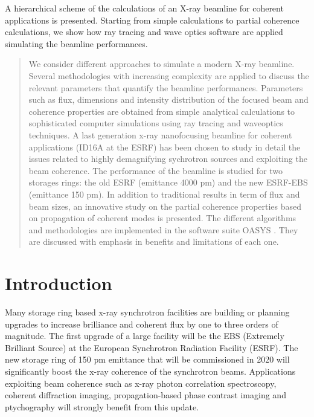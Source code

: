 \documentclass{iucr}              %
\begin{document}


\maketitle                        %

\begin{synopsis}
A hierarchical scheme of the calculations of an X-ray beamline for coherent applications is presented. Starting from simple calculations to partial coherence calculations, we show how ray tracing and wave optics software are applied simulating the beamline performances.   
\end{synopsis}

\begin{abstract}
We consider different approaches to simulate a modern X-ray beamline. Several methodologies with increasing complexity are applied to discuss the relevant parameters that quantify the beamline performances. Parameters such as flux, dimensions and intensity distribution of the focused beam and coherence properties are obtained from simple analytical calculations to sophisticated computer simulations using ray tracing and waveoptics techniques. A last generation x-ray nanofocusing beamline for coherent  applications (ID16A at the ESRF) has been chosen  to study in detail the issues related to highly demagnifying sychrotron sources and exploiting the beam coherence. The performance of the beamline is studied for two storages rings: the old ESRF (emittance 4000 pm) and the new ESRF-EBS (emittance 150 pm). In addition to traditional results in term of flux and beam sizes, an innovative study on the partial coherence properties based on propagation of coherent modes is presented. The different algorithms and methodologies are implemented in the software suite OASYS \cite{codeOASYS}. They are discussed with emphasis in benefits and limitations of each one. 
\end{abstract}


     
\section{Introduction}


Many storage ring based x-ray synchrotron facilities are building or planning upgrades to increase brilliance and coherent flux by one to three orders of magnitude.  The first upgrade of a large facility will be the EBS (Extremely Brilliant Source) \cite{orangebook} at the European Synchrotron Radiation Facility (ESRF). The new storage ring of 150 pm emittance that will be commissioned in 2020 will significantly boost the x-ray coherence of the synchrotron beams. Applications exploiting beam coherence such as x-ray photon correlation spectroscopy, coherent diffraction imaging, propagation-based phase contrast imaging and ptychography will strongly benefit from this update.  
\end{document}
